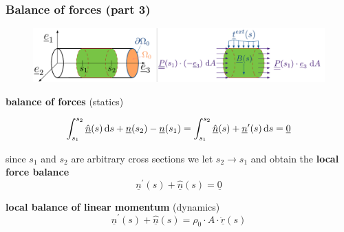 \begin{frame}
  \frametitle{Balance of forces (part 3)}
  
  \begin{figure}
    \centering
    \includegraphics[width=22cm, keepaspectratio=true]{sections/cosserat_rods/images/Forces}
  \end{figure}
  
  \textbf{balance of forces} (statics)
  
  \begin{displaymath}
    \int_{s_1}^{s_2} \underline{\hat{n}}(s) \dif s + \underline{n}(s_2) - \underline{n}(s_1) =
    \int_{s_1}^{s_2} \underline{\hat{n}}(s) + \underline{n}^{\prime}(s) \dif s =
    \underline{0}
  \end{displaymath}
  
  since $s_1$ and $s_2$ are arbitrary cross sections we let $s_2 \to s_1$ \newline
  and obtain the \textbf{local force balance}
  \begin{displaymath}
    \underline{n}^{\prime}(s) + \underline{\hat{n}}(s) = \underline{0}
  \end{displaymath}
  \vspace{0.6em}
  
  \textbf{local balance of linear momentum} (dynamics)
  \begin{displaymath}
    \underline{n}^{\prime}(s) + \underline{\hat{n}}(s) = \rho_0 \cdot A \cdot \underline{\ddot{r}}(s)
  \end{displaymath}
\end{frame}


